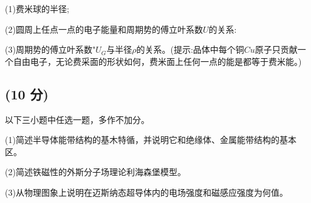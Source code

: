 (1)费米球的半径;

(2)圆周上任点一点的电子能量和周期势的傅立叶系数$U$的关系:

(3)周期势的傅立叶系数"$U_G$与半径$\rho $的关系。(提示:品体中每个铜$Cu$原子只贡献一个自由电子，无论费采面的形状如何，费米面上任何一点的能是都等于费米能。)
\subsection{(10 分)}
以下三小题中任选一题，多作不加分。

(1)简述半导体能带结构的基木特循，并说明它和绝缘体、金属能带结构的基本区。

(2)简述铁磁性的外斯分子场理论利海森堡模型。

(3)从物理图象上说明在迈斯纳态超导体内的电场强度和磁感应强度为何值。